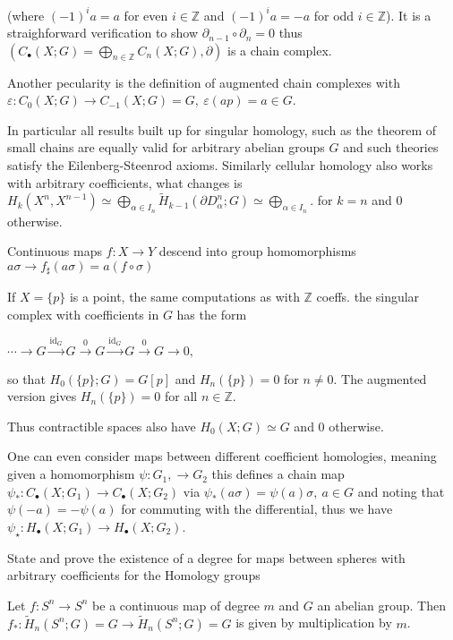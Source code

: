 (where \((-1)^i a = a\) for even \(i \in \mathbb{Z}\) and \((-1)^i a = -a\) for odd \(i \in \mathbb{Z}\)). 
It is a straighforward verification to show \(\partial_{n-1} \circ \partial_n = 0\) 
thus \((C_\bullet(X; G) = \bigoplus_{n \in \mathbb{Z}} C_n(X; G), \partial)\) is a chain complex.

Another pecularity is the definition of augmented chain complexes with
\(\varepsilon : C_0(X;G) \to C_{-1}(X;G) = G,\ \varepsilon(ap) = a \in G \).

In particular all results built up for singular homology, such as the theorem of small chains
are equally valid for arbitrary abelian groups \( G \) and such theories satisfy the Eilenberg-Steenrod axioms.
Similarly cellular homology also works with arbitrary coefficients, what changes is 
\( H_k(X^n, X^{n-1}) \simeq \bigoplus_{\alpha \in I_n} \tilde{H}_{k-1}(\partial D^n_\alpha;G) \simeq \bigoplus_{\alpha \in I_n} \).
for \( k = n \) and \( 0 \) otherwise.

Continuous maps \( f : X \to Y \) descend into group homomorphisms \( a\sigma \to f_\sharp(a\sigma) = a(f\circ\sigma) \)

If \( X = \{p\} \) is a point, the same computations as with \( \mathbb{Z} \) coeffs.
the singular complex with coefficients in \( G \) has the form

\(\cdots \xrightarrow{} G \xrightarrow{\text{id}_G} G \xrightarrow{0} G \xrightarrow{\text{id}_G} G \xrightarrow{0} G \xrightarrow{} 0, \)

so that \(H_0(\{p\}; G) = G[p]\) and \(H_n(\{p\}) = 0\) for \(n \neq 0\). 
The augmented version gives \(H_n(\{p\}) = 0\) for all \(n \in \mathbb{Z}\).

Thus contractible spaces also have \( H_0(X;G) \simeq G \) and \( 0 \) otherwise.

One can even consider maps between different coefficient homologies, meaning given a homomorphism \( \psi : G_1, \to G_2 \)
this defines a chain map \( \psi_\ast : C_\bullet(X;G_1) \to C_\bullet(X;G_2) \) via \( \psi_\ast(a\sigma) = \psi(a)\sigma,\ a \in G \)
and noting that \( \psi(-a) = -\psi(a) \) for commuting with the differential, thus we have \( \psi_\star : H_\bullet(X;G_1) \to H_\bullet(X;G_2) \).



State and prove the existence of a degree for maps between spheres with arbitrary coefficients for the Homology groups

Let \(f : S^n \to S^n\) be a continuous map of degree \(m\) and \(G\) an abelian group. 
Then \(f_* : \tilde{H}_n(S^n; G) = G \to \tilde{H}_n(S^n; G) = G\) is given by multiplication by \(m\).

